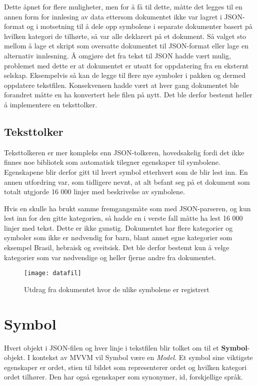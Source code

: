 Dette åpnet for flere muligheter, men for å få til dette, måtte det legges til en annen form for innlesing av data ettersom dokumentet ikke var lagret i JSON-format og i motsetning til å dele opp symbolene i separate dokumenter basert på hvilken kategori de tilhørte, så var alle deklarert på et dokument. Så  valget sto mellom å lage et skript som oversatte dokumentet til JSON-format eller lage en alternativ innlesning. Å omgjøre det fra tekst til JSON hadde vært mulig, problemet med dette er at dokumentet er utsatt for oppdatering fra en eksternt selskap. Eksempelvis så kan de legge til flere nye symboler i pakken og dermed oppdatere tekstfilen. Konsekvensen hadde vært at hver gang dokumentet ble forandret måtte en ha konvertert hele filen på nytt. Det ble derfor bestemt heller å implementere en teksttolker. 

\subsection{Teksttolker}

Teksttolkeren er mer kompleks enn JSON-tolkeren, hovedsakelig fordi det ikke finnes noe bibliotek som automatisk tilegner egenskaper til symbolene. Egenskapene blir derfor gitt til hvert symbol etterhvert som de blir lest inn. En annen utfordring var, som tidligere nevnt, at alt befant seg på et dokument som totalt utgjorde 16 000 linjer med beskrivelse av symbolene. 

Hvis en skulle ha brukt samme fremgangsmåte som med JSON-parseren, og kun lest inn for den gitte kategorien, så hadde en i verste fall måtte ha lest 16 000 linjer med tekst. Dette er ikke gunstig. Dokumentet har flere kategorier og symboler som ikke er nødvendig for barn, blant annet egne kategorier som eksempel Brasil, hebraisk og sveitsisk. Det ble derfor bestemt kun å velge kategorier som var nødvendige og heller fjerne andre fra dokumentet.

\begin{figure}[ht!] 
\centering 
\texttt{[image: datafil]} 
\caption{Utdrag fra dokumentet hvor de ulike symbolene er registrert} 
\label{fig:dok} 
\end{figure} 


\section{Symbol}

Hvert objekt i JSON-filen og hver linje i tekstfilen blir tolket om til et \textbf{Symbol}-objekt. I kontekst av MVVM vil Symbol være en \textit{Model}. Et symbol sine viktigste egenskaper er ordet, stien til bildet som representerer ordet og hvilken kategori ordet tilhører. Den har også egenskaper som synonymer, id, forskjellige språk. 

